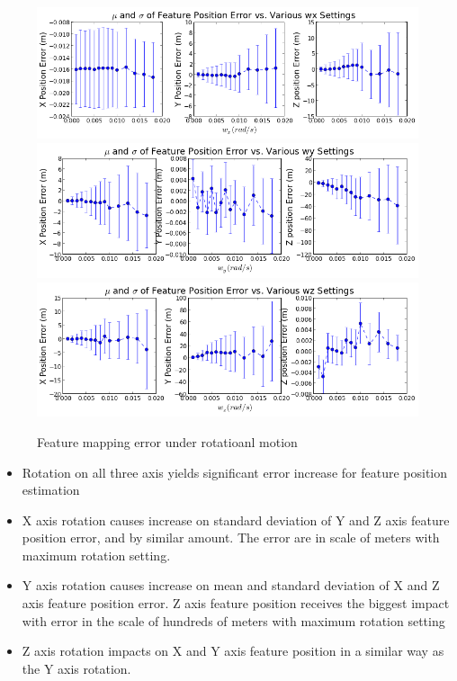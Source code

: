 \begin{figure}[h]
  \centering
  \includegraphics[scale=0.5]{./Figures/SimulationFigures/Figure22.png}
  \includegraphics[scale=0.5]{./Figures/SimulationFigures/Figure23.png}
  \includegraphics[scale=0.5]{./Figures/SimulationFigures/Figure24.png}
  \caption{Feature mapping error under rotatioanl motion}
  \label{fig:simfig22-24}
\end{figure}


\begin{itemize}
  \item Rotation on all three axis yields significant error increase
  for feature position estimation
  \item X axis rotation causes increase on standard deviation of Y and
  Z axis feature position error, and by similar amount. The error are
  in scale of meters with maximum rotation setting.
  \item Y axis rotation causes increase on mean and standard deviation
  of X and Z axis feature position error. Z axis feature position
  receives the biggest impact with error in the scale of hundreds of
  meters with maximum rotation setting
  \item Z axis rotation impacts on X and Y axis feature position in a
  similar way as the Y axis rotation.
\end{itemize}

